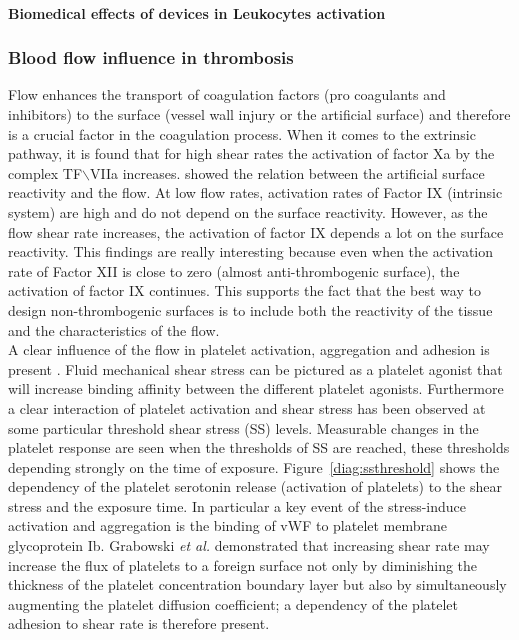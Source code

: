 \documentclass[%
 nofootinbib,
 amsmath,amssymb,
 aps,
 pra,
]{revtex4-1}
\begin{document}
\paragraph{Biomedical effects of devices in Leukocytes activation}

\subsubsection{Blood flow influence in thrombosis}
Flow enhances the transport of coagulation factors (pro coagulants and inhibitors) to the surface (vessel wall injury or the artificial surface) and therefore is a crucial factor in the coagulation process. When it comes to the extrinsic pathway, it is found that for high shear rates the activation of factor Xa by the complex TF$\backslash$VIIa increases. \citet{Basmadjian:1997} showed the relation between the artificial surface reactivity and the flow. At low flow rates, activation rates of Factor IX (intrinsic system) are high and do not depend on  the surface reactivity. However, as the flow shear rate increases, the activation of factor IX depends a lot on the surface reactivity. This findings are really interesting because even when the activation rate of Factor XII is close to zero (almost anti-thrombogenic surface), the activation of factor IX continues. This supports the fact that the best way to design non-thrombogenic surfaces is to include both the reactivity of the tissue and the characteristics of the flow.\\
A clear influence of the flow in platelet activation, aggregation and adhesion is present \citep{Hellums:1994,Turitto:1975,Grabowski:1972}. Fluid mechanical shear stress can be pictured as a platelet agonist that will increase binding affinity between the different platelet agonists. Furthermore a clear interaction of platelet activation and shear stress has been observed at some particular threshold %
shear stress (SS) levels. Measurable changes in the platelet response are seen when the thresholds of SS are reached, these thresholds depending strongly on the time of exposure. Figure~\ref{diag:ssthreshold} shows the dependency of the platelet serotonin release (activation of platelets) to the shear stress and the exposure time. In particular a key event of the stress-induce activation and aggregation is the binding of vWF to platelet membrane glycoprotein Ib. Grabowski \textit{et al.} \citep{Grabowski:1972} demonstrated that increasing shear rate may increase the flux of platelets to a foreign surface not only by diminishing the thickness of the platelet concentration boundary layer but also by simultaneously augmenting the platelet diffusion coefficient; a dependency of the platelet adhesion to shear rate is therefore present.\\
\end{document}
